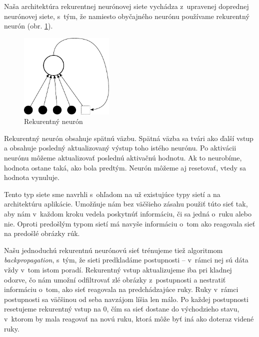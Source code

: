 Naša architektúra rekurentnej neurónovej siete vychádza z~upravenej doprednej neurónovej siete, s~tým, že namiesto obyčajného neurónu používame rekurentný neurón (obr. \ref{fig:recurentneuron}). 

\begin{figure}[b]
  \begin{center}
    \includegraphics[width=0.4\textwidth]{images/recneuron}
  \end{center}
  \caption{Rekurentný neurón}
  \label{fig:recurentneuron}
\end{figure}

Rekurentný neurón obsahuje spätnú väzbu. Spätná väzba sa tvári ako ďalší vstup a obsahuje posledný aktualizovaný výstup toho istého neurónu. Po aktivácii neurónu môžeme aktualizovať poslednú aktivačnú hodnotu. Ak to neurobíme, hodnota ostane taká, ako bola predtým. Neurón môžeme aj resetovať, vtedy sa hodnota vynuluje.

Tento typ siete sme navrhli s~ohľadom na už existujúce typy sietí a na architektúru aplikácie. Umožňuje nám bez väčšieho zásahu použiť túto sieť tak, aby nám v~každom kroku vedela poskytnúť informáciu, či sa jedná o~ruku alebo nie. Oproti predošlým typom sietí má navyše informáciu o~tom ako reagovala sieť na predošlé obrázky rúk.

Našu jednoduchú rekurentnú neurónovú sieť trénujeme tiež algoritmom \textit{backpropagation}, s~tým, že sieti predkladáme postupnosti -- v~rámci nej sú dáta vždy v~tom istom poradí. Rekurentný vstup aktualizujeme iba pri kladnej odozve, čo nám umožní odfiltrovať zlé obrázky z~postupnosti a nestratiť informáciu o~tom, ako sieť reagovala na predchádzajúce ruky. Ruky v~rámci postupnosti sa väčšinou od seba navzájom líšia len málo. Po každej postupnosti resetujeme rekurentný vstup na 0, čím sa sieť dostane do východzieho stavu, v~ktorom by mala reagovať na novú ruku, ktorá môže byť iná ako doteraz videné ruky.
